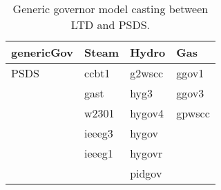 	\begin{singlespace}
\begin{table}[H]
	\centering
	\begin{tabular}{@{} C{2cm} C{2cm} C{2cm} C{2cm}  @{}} 	
		\toprule %
		\footnotesize %
		\raggedright %
	genericGov		&	Steam	&	Hydro	&	Gas	\\		
		\midrule		
PSDS	&	ccbt1	&	g2wscc	& ggov1\\
				&	gast	&	hyg3	& ggov3\\
				&	w2301	&	hygov4	& gpwscc\\
				&	ieeeg3	&	hygov	& \\
				&	ieeeg1	&	hygovr	& \\
				&			& pidgov & \\
		\bottomrule
	\end{tabular}
	\caption{Generic governor model casting between LTD and PSDS.}
	\label{tab:genGovCasting}
\end{table}
	\end{singlespace}